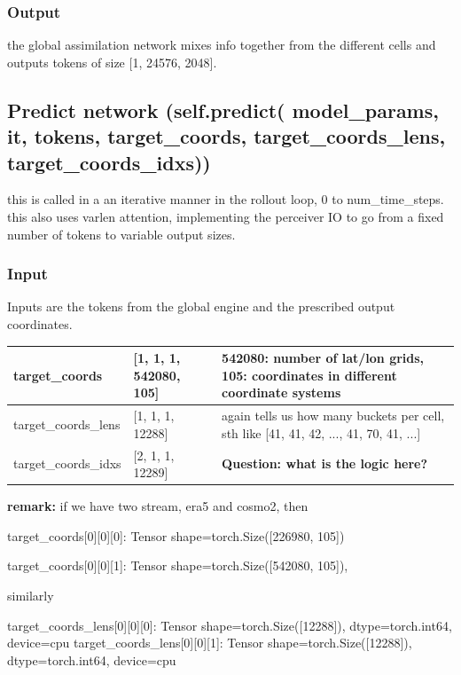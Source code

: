 \documentclass{article}
\begin{document}
\subsubsection{Output}
the global assimilation network mixes info together from the different cells and outputs tokens of size [1, 24576, 2048]. 

\subsection{Predict network (self.predict( model\_params, it, tokens, target\_coords, target\_coords\_lens, target\_coords\_idxs))}

this is called in a an iterative manner in the rollout loop, 0 to num\_time\_steps. this also uses varlen attention, implementing the perceiver IO to go from a fixed number of tokens to variable output sizes.


\subsubsection{Input}
Inputs are the tokens from the global engine and the prescribed output coordinates.

\begin{table}[]
\begin{tabular}{|l|l|l|}
\hline
target\_coords & [1, 1, 1, 542080, 105] & 542080: number of lat/lon grids, 105: coordinates in different coordinate systems \\ \hline
 target\_coords\_lens   & [1, 1, 1, 12288]     &  again tells us how many buckets per cell, sth like [41, 41, 42, ..., 41, 70, 41, ...]   \\ \hline
  target\_coords\_idxs  &   	[2, 1, 1, 12289]   &    \textbf{Question: what is the logic here?} \\ \hline
\end{tabular}
\end{table}

\textbf{remark:} if we have two stream, era5 and cosmo2, then

 target\_coords[0][0][0]: Tensor shape=torch.Size([226980, 105])

target\_coords[0][0][1]: Tensor shape=torch.Size([542080, 105]),

similarly 

target\_coords\_lens[0][0][0]: Tensor shape=torch.Size([12288]), dtype=torch.int64, device=cpu
target\_coords\_lens[0][0][1]: Tensor shape=torch.Size([12288]), dtype=torch.int64, device=cpu
\end{document}
